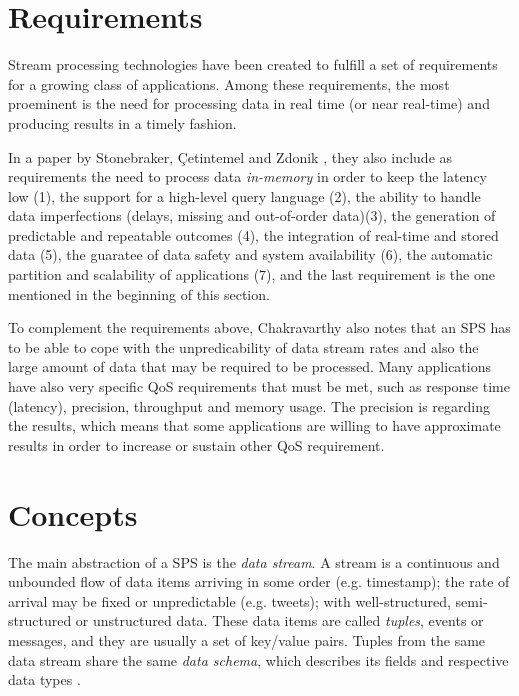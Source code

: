 \documentclass[ppgc,diss,english]{iiufrgs}
\begin{document}
\section{Requirements}
\label{sec:esp:requirements}

Stream processing technologies have been created to fulfill a set of requirements for a growing class of applications. Among these requirements, the most proeminent is the need for processing data in real time (or near real-time) and producing results in a timely fashion.

In a paper by Stonebraker, {\c{C}}etintemel and Zdonik \cite{stonebraker20058}, they also include as requirements the need to process data \emph{in-memory} in order to keep the latency low (1), the support for a high-level query language (2), the ability to handle data imperfections (delays, missing and out-of-order data)(3), the generation of predictable and repeatable outcomes (4), the integration of real-time and stored data (5), the guaratee of data safety and system availability (6), the automatic partition and scalability of applications (7), and the last requirement is the one mentioned in the beginning of this section.

To complement the requirements above, Chakravarthy \cite{chakravarthy2009stream} also notes that an SPS has to be able to cope with the unpredicability of data stream rates and also the large amount of data that may be required to be processed. Many applications have also very specific QoS requirements that must be met, such as response time (latency), precision, throughput and memory usage. The precision is regarding the results, which means that some applications are willing to have approximate results in order to increase or sustain other QoS requirement.


\section{Concepts}
\label{sec:esp:concepts}

The main abstraction of a SPS is the \emph{data stream}. A stream is a continuous and unbounded flow of data items arriving in some order (e.g. timestamp); the rate of arrival may be fixed or unpredictable (e.g. tweets); with well-structured, semi-structured or unstructured data. These data items are called \emph{tuples}, events or messages, and they are usually a set of key/value pairs. Tuples from the same data stream share the same \emph{data schema}, which describes its fields and respective data types \cite{chakravarthy2009stream}.
\end{document}
